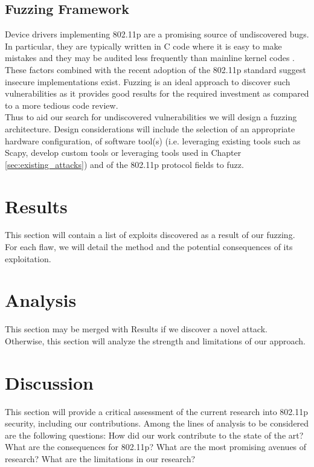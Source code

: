 \documentclass[conference]{IEEEtran}
\begin{document}
\subsection{Fuzzing Framework}
Device drivers implementing 802.11p are a promising source of undiscovered bugs. In particular, they are typically written in C code where it is easy to make mistakes and they may be audited less frequently than mainline kernel codes \cite{butti2008discovering}. These factors combined with the recent adoption of the 802.11p standard suggest insecure implementations exist. Fuzzing is an ideal approach to discover such vulnerabilities as it provides good results for the required investment as compared to a more tedious code review.\\

Thus to aid our search for undiscovered vulnerabilities we will design a fuzzing architecture. Design considerations will include the selection of an appropriate hardware configuration, of software tool(s) (i.e. leveraging existing tools such as Scapy, develop custom tools or leveraging tools used in Chapter \ref{sec:existing_attacks}) and of the 802.11p protocol fields to fuzz.

\section{Results}
This section will contain a list of exploits discovered as a result of our fuzzing. For each flaw, we will detail the method and the potential consequences of its exploitation.

\section{Analysis}
This section may be merged with Results if we discover a novel attack. Otherwise, this section will analyze the strength and limitations of our approach.

\section{Discussion}
This section will provide a critical assessment of the current research into 802.11p security, including our contributions. Among the lines of analysis to be considered are the following questions: How did our work contribute to the state of the art? What are the consequences for 802.11p? What are the most promising avenues of research? What are the limitations in our research?



\end{document}
